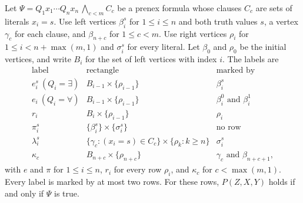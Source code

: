 \begin{theorem}
\label{core:thm:quantified-cube-cuts}
Let $\Psi=Q_1x_1\cdots Q_nx_n\,\bigwedge_{c<m}C_c$ be a prenex formula
whose clauses $C_c$ are sets of literals $x_i=s$. Use left vertices
$\beta_i^s$ for $1\le i\le n$ and both truth values $s$, a vertex
$\gamma_c$ for each clause, and $\beta_{n+c}$ for $1\le c<m$. Use right
vertices $\rho_i$ for $1\le i<n+\max(m,1)$ and $\sigma_i^s$ for every
literal. Let $\beta_0$ and $\rho_0$ be the initial vertices, and write
$B_i$ for the set of left vertices with index $i$. The labels are
\[
\begin{array}{lll}
 \text{label}&\text{rectangle}&\text{marked by}\\\hline
 e_i^s\ (Q_i=\exists)&B_{i-1}\times\{\rho_{i-1}\}&\beta_i^s\\
 e_i\ (Q_i=\forall)&B_{i-1}\times\{\rho_{i-1}\}&\beta_i^0\text{ and }\beta_i^1\\
 r_i&B_i\times\{\rho_{i-1}\}&\rho_i\\
 \pi_i^s&\{\beta_i^s\}\times\{\sigma_i^s\}&\text{no row}\\
 \lambda_i^s&\{\gamma_c:(x_i=s)\in C_c\}\times\{\rho_k:k\ge n\}&\sigma_i^s\\
 \kappa_c&B_{n+c}\times\{\rho_{n+c}\}&\gamma_c\text{ and }\beta_{n+c+1},
\end{array}
\]
with $e$ and $\pi$ for $1\le i\le n$, $r_i$ for every row $\rho_i$, and
$\kappa_c$ for $c<\max(m,1)$. Every label is marked by at most two rows.
For these rows, $P(Z,X,Y)$ holds if and only if $\Psi$ is true.
\end{theorem}
